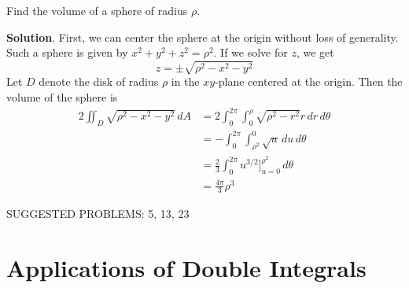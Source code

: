 \documentclass[10pt,]{book}
\theoremstyle{ptxplainnotitle}
\theoremstyle{ptxplaintitle}
\theoremstyle{ptxplainnotitle}
\theoremstyle{ptxplaintitle}
\theoremstyle{ptxplainnotitle}
\theoremstyle{ptxplaintitle}
\theoremstyle{ptxdefinitionnotitle}
\theoremstyle{ptxdefinitiontitle}
\theoremstyle{ptxdefinitionnotitle}
\theoremstyle{ptxdefinitiontitle}
\theoremstyle{ptxdefinitionnotitle}
\theoremstyle{ptxdefinitiontitle}
\theoremstyle{ptxdefinitionnotitle}
\theoremstyle{ptxdefinitiontitle}
\theoremstyle{ptxdefinitionnotitle}
\theoremstyle{ptxdefinitiontitle}
\numberwithin{equation}{section}
\begin{document}
\begin{example}\label{example-volume-of-a-sphere}
\hypertarget{p-1150}{}%
Find the volume of a sphere of radius \(\rho\).%
\par\smallskip%
\noindent\textbf{Solution}.\hypertarget{solution-183}{}\quad%
\hypertarget{p-1151}{}%
First, we can center the sphere at the origin without loss of generality. Such a sphere is given by \(x^{2} + y^{2} + z^{2} = \rho^{2}\). If we solve for \(z\), we get%
\begin{equation*}
z = \pm\sqrt{\rho^{2} - x^{2} - y^{2}}
\end{equation*}
Let \(D\) denote the disk of radius \(\rho\) in the \(xy\)-plane centered at the origin. Then the volume of the sphere is%
\begin{align*}
2\iint_{D}\sqrt{\rho^{2} - x^{2} - y^{2}}\,dA & = 2\int_{0}^{2\pi}\int_{0}^{\rho}\sqrt{\rho^{2} - r^{2}}r\,dr\,d\theta \\
& = -\int_{0}^{2\pi}\int_{\rho^{2}}^{0}\sqrt{u}\,du\,d\theta \\
& = \frac{2}{3}\int_{0}^{2\pi}u^{3/2}\bigg]_{u=0}^{\rho^{2}}\,d\theta \\
& = \frac{4\pi}{3}\rho^{3} 
\end{align*}
%
\end{example}
\hypertarget{p-1152}{}%
SUGGESTED PROBLEMS: 5, 13, 23%
\typeout{************************************************}
\typeout{************************************************}
\section[{Applications of Double Integrals}]{Applications of Double Integrals}\label{section-applications-of-double-integrals}
\typeout{************************************************}
\typeout{************************************************}
\end{document}
